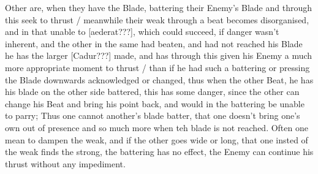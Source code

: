 Other are, when they have the Blade, battering their Enemy's Blade and
through this seek to thrust / meanwhile their weak through a beat
becomes disorganised, and in that unable to [aederat???], which could
succeed, if  danger wasn't inherent, and the other in the same had
beaten, and had not reached his Blade he has the larger [Cadur???]
made, and has through this given his Enemy a much more appropriate
moment to thrust / than if he had such a battering or pressing the
Blade downwards acknowledged or changed, thus when the other Beat, he
has his blade on the other side battered, this has some danger, since
the other can change his Beat and bring his point back, and would in
the battering be unable to parry; Thus one cannot another's blade
batter, that one doesn't bring one's own out of
presence and so much more when teh blade is not
reached. Often one mean to dampen the weak, and if the other goes wide
or long, that one insted of the weak finds the strong, the battering
has no effect, the Enemy can continue his thrust without any impediment.


